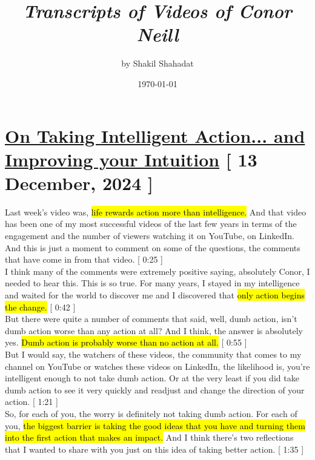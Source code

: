 \documentclass[a4paper,12pt]{article}
\begin{document}
\title{ \textit{Transcripts of Videos of Conor Neill}  }
	\author{ by Shakil Shahadat }
	\date{ \today }
\maketitle

\thispagestyle{empty}

\newpage




\section{ \href{https://www.youtube.com/watch?v=5dC5g7wgxOA}{On Taking Intelligent Action... and Improving your Intuition} [ 13 December, 2024 ] }


Last week's video was, \hl{life rewards action more than intelligence.} And that video has been one of my most successful videos of the last few years in terms of the engagement and the number of viewers watching it on YouTube, on LinkedIn. And this is just a moment to comment on some of the questions, the comments that have come in from that video. [ 0:25 ] \\

I think many of the comments were extremely positive saying, absolutely Conor, I needed to hear this. This is so true. For many years, I stayed in my intelligence and waited for the world to discover me and I discovered that \hl{only action begins the change.} [ 0:42 ] \\
 
But there were quite a number of comments that said, well, dumb action, isn't dumb action worse than any action at all? And I think, the answer is absolutely yes. \hl{Dumb action is probably worse than no action at all.} [ 0:55 ] \\

But I would say, the watchers of these videos, the community that comes to my channel on YouTube or watches these videos on LinkedIn, the likelihood is, you're intelligent enough to not take dumb action. Or at the very least if you did take dumb action to see it very quickly and readjust and change the direction of your action. [ 1:21 ] \\

So, for each of you, the worry is definitely not taking dumb action. For each of you, \hl{the biggest barrier is taking the good ideas that you have and turning them into the first action that makes an impact.} And I think there's two reflections that I wanted to share with you just on this idea of taking better action. [ 1:35 ] \\
\end{document}
